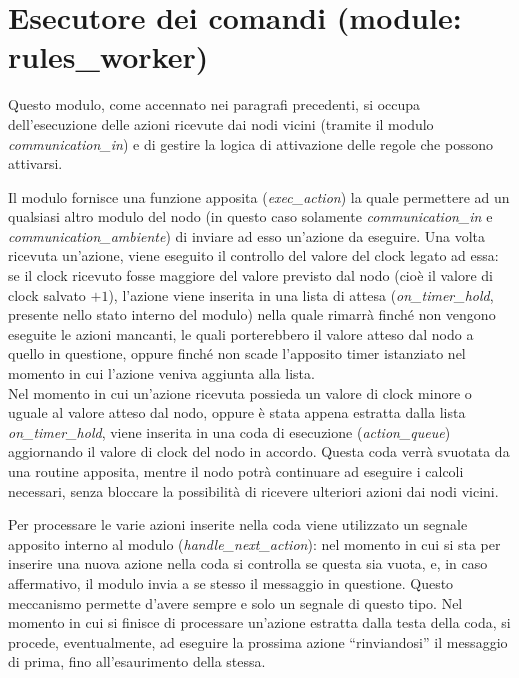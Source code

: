 \documentclass[italian]{memoir}
\begin{document}
\section{Esecutore dei comandi (module: rules\_worker)}\label{impl:rules_worker}

Questo modulo, come accennato nei paragrafi precedenti, si occupa dell'esecuzione delle azioni ricevute dai nodi vicini (tramite il modulo \textit{communication\_in}) e di gestire la logica di attivazione delle regole che possono attivarsi.

Il modulo fornisce una funzione apposita (\textit{exec\_action}) la quale permettere ad un qualsiasi altro modulo del nodo (in questo caso solamente \textit{communication\_in} e \textit{communication\_ambiente}) di inviare ad esso un'azione da eseguire. Una volta ricevuta un'azione, viene eseguito il controllo del valore del clock legato ad essa: se il clock ricevuto fosse maggiore del valore previsto dal nodo (cioè il valore di clock salvato $+ 1$), l'azione viene inserita in una lista di attesa (\textit{on\_timer\_hold}, presente nello stato interno del modulo) nella quale rimarrà finché non vengono eseguite le azioni mancanti, le quali porterebbero il valore atteso dal nodo a quello in questione, oppure finché non scade l'apposito timer istanziato nel momento in cui l'azione veniva aggiunta alla lista.\\ %
Nel momento in cui un'azione ricevuta possieda un valore di clock minore o uguale al valore atteso dal nodo, oppure è stata appena estratta dalla lista \textit{on\_timer\_hold}, viene inserita in una coda di esecuzione (\textit{action\_queue}) aggiornando il valore di clock del nodo in accordo. Questa coda verrà svuotata da una routine apposita, mentre il nodo potrà continuare ad eseguire i calcoli necessari, senza bloccare la possibilità di ricevere ulteriori azioni dai nodi vicini. 

Per processare le varie azioni inserite nella coda viene utilizzato un segnale apposito interno al modulo (\textit{handle\_next\_action}): nel momento in cui si sta per inserire una nuova azione nella coda si controlla se questa sia vuota, e, in caso affermativo, il modulo invia a se stesso il messaggio in questione. Questo meccanismo permette d'avere sempre e solo un segnale di questo tipo. Nel momento in cui si finisce di processare un'azione estratta dalla testa della coda, si procede, eventualmente, ad eseguire la prossima azione ``rinviandosi'' il messaggio di prima, fino all'esaurimento della stessa.
\end{document}
